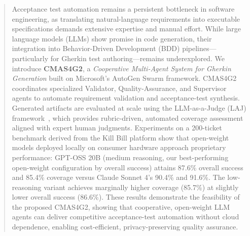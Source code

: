 \documentclass[runningheads]{llncs}
\begin{document}
\maketitle
\begin{abstract}
Acceptance test automation remains a persistent bottleneck in software engineering, as translating natural-language requirements into executable specifications demands extensive expertise and manual effort. While large language models (LLMs) show promise in code generation, their integration into Behavior-Driven Development (BDD) pipelines---particularly for Gherkin test authoring---remains underexplored.
We introduce \textbf{CMAS4G2}, a \emph{Cooperative Multi-Agent System for Gherkin Generation} built on Microsoft's AutoGen Swarm framework. CMAS4G2 coordinates specialized Validator, Quality-Assurance, and Supervisor agents to automate requirement validation and acceptance-test synthesis. Generated artifacts are evaluated at scale using the LLM-as-a-Judge (LAJ) framework~\cite{huang2025laj}, which provides rubric-driven, automated coverage assessment aligned with expert human judgments.
Experiments on a 200-ticket benchmark derived from the Kill Bill platform show that open-weight models deployed locally on consumer hardware approach proprietary performance: %
GPT-OSS 20B (medium reasoning, our best-performing open-weight configuration by overall success) attains 87.6\% overall success and 85.4\% coverage versus Claude Sonnet 4's 90.4\% and 91.6\%. The low-reasoning variant achieves marginally higher coverage (85.7\%) at slightly lower overall success (86.6\%).
These results demonstrate the feasibility of the proposed CMAS4G2, showing that cooperative, open-weight LLM agents can deliver competitive acceptance-test automation without cloud dependence, enabling cost-efficient, privacy-preserving quality assurance.
\end{abstract}
\end{document}
